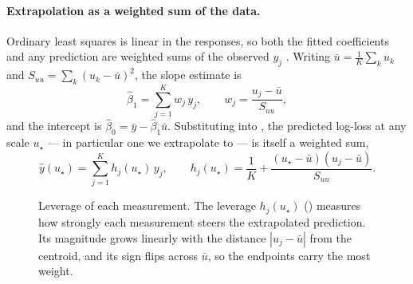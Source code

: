 \paragraph{Extrapolation as a weighted sum of the data.}
Ordinary least squares is linear in the responses, so both the fitted coefficients and any prediction are weighted sums of the observed $y_j$ \citep{brook2018applied, montgomery2022introduction}. Writing $\bar u = \tfrac1K \sum_k u_k$ and $S_{uu} = \sum_k (u_k - \bar u)^2$, the slope estimate is
%
\begin{equation}\label{eq:ols-slope}
    \hat\beta_1 = \sum_{j=1}^{K} w_j\, y_j, \qquad w_j = \frac{u_j - \bar u}{S_{uu}},
\end{equation}
%
and the intercept is $\hat\beta_0 = \bar y - \hat\beta_1 \bar u$. Substituting into , the predicted log-loss at any scale $u_\star$ --- in particular one we extrapolate to --- is itself a weighted sum,
%
\begin{equation}\label{eq:prediction-weights}
    \hat y(u_\star) = \sum_{j=1}^{K} h_j(u_\star)\, y_j, \qquad h_j(u_\star) = \frac{1}{K} + \frac{(u_\star - \bar u)(u_j - \bar u)}{S_{uu}}.
\end{equation}

\begin{figure}
    \vspace{-0.9cm}
    \centering
    \caption{
        Leverage of each measurement. The leverage $h_j(u_\star)$ () measures how strongly each measurement steers the extrapolated prediction. Its magnitude grows linearly with the distance $|u_j - \bar u|$ from the centroid, and its sign flips across $\bar u$, so the endpoints carry the most weight.
    }
    \label{fig:leverage}
    \vspace{-0.6cm}
\end{figure}


